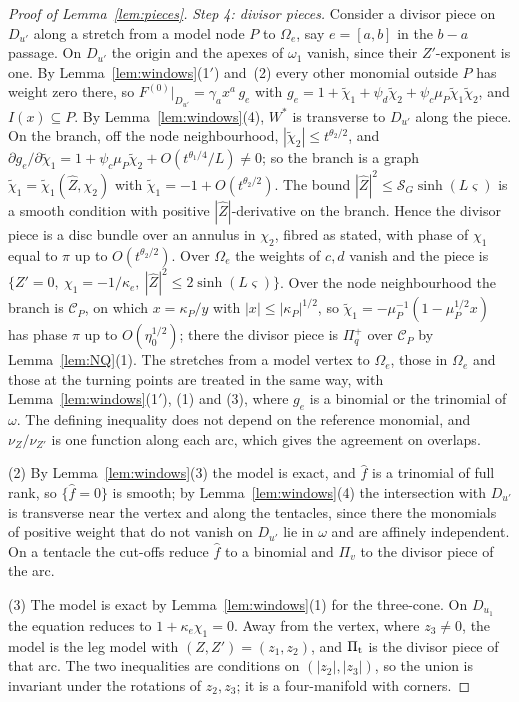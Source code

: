 \begin{proof}[Proof of Lemma~\ref{lem:pieces}]
\emph{Step 4: divisor pieces.} Consider a divisor piece on $D_{u'}$ along a stretch from a model node $P$ to $\Omega_e$,
say $e=[a,b]$ in the $b-a$ passage. On $D_{u'}$ the origin and the apexes of $\omega_1$ vanish, since their
$Z'$-exponent is one. By Lemma~\ref{lem:windows}(1$'$) and~(2) every other monomial outside $P$ has weight zero there, so
$F^{(0)}|_{D_{u'}}=\gamma_ax^a\,g_e$ with $g_e=1+\tilde\chi_1+\psi_d\tilde\chi_2+\psi_c\mu_P\tilde\chi_1\tilde\chi_2$, and
$I(x)\subseteq P$. By Lemma~\ref{lem:windows}(4), $W^*$ is transverse to $D_{u'}$ along the piece. On the branch, off the
node neighbourhood, $|\tilde\chi_2|\le t^{\theta_2/2}$, and $\partial g_e/\partial\tilde\chi_1=1+\psi_c\mu_P\tilde\chi_2+
O(t^{\theta_1/4}/L)\ne0$; so the branch is a graph $\tilde\chi_1=\tilde\chi_1(\hat Z,\chi_2)$ with $\tilde\chi_1=-1+
O(t^{\theta_2/2})$. The bound $|\hat Z|^2\le\mathcal S_G\sinh(L\varsigma)$ is a smooth condition with positive
$|\hat Z|$-derivative on the branch. Hence the divisor piece is a disc bundle over an annulus in $\chi_2$, fibred as
stated, with phase of $\chi_1$ equal to $\pi$ up to $O(t^{\theta_2/2})$. Over $\Omega_e$ the weights of $c,d$ vanish and
the piece is $\{Z'=0,\ \chi_1=-1/\kappa_e,\ |\hat Z|^2\le2\sinh(L\varsigma)\}$. Over the node neighbourhood the branch is
$\mathscr C_P$, on which $x=\kappa_P/y$ with $|x|\le|\kappa_P|^{1/2}$, so $\tilde\chi_1=-\mu_P^{-1}(1-\mu_P^{1/2}x)$ has phase
$\pi$ up to $O(\eta_0^{1/2})$; there the divisor piece is $\Pi^+_q$ over $\mathscr C_P$ by Lemma~\ref{lem:NQ}(1). The
stretches from a model vertex to $\Omega_e$, those in $\Omega_e$ and those at the turning points are treated in the same
way, with Lemma~\ref{lem:windows}(1$'$), (1) and (3), where $g_e$ is a binomial or the trinomial of $\omega$. The defining
inequality does not depend on the reference monomial, and $\nu_Z/\nu_{Z'}$ is one function along each arc, which gives
the agreement on overlaps.

(2) By Lemma~\ref{lem:windows}(3) the model is exact, and $\hat f$ is a trinomial of full rank, so $\{\hat f=0\}$ is smooth;
by Lemma~\ref{lem:windows}(4) the intersection with $D_{u'}$ is transverse near the vertex and along the tentacles, since
there the monomials of positive weight that do not vanish on $D_{u'}$ lie in $\omega$ and are affinely independent. On a
tentacle the cut-offs reduce $\hat f$ to a binomial and $\Pi_v$ to the divisor piece of the arc.

(3) The model is exact by Lemma~\ref{lem:windows}(1) for the three-cone. On $D_{u_1}$ the equation reduces to
$1+\kappa_e\chi_1=0$. Away from the vertex, where $z_3\ne0$, the model is the leg model with $(Z,Z')=(z_1,z_2)$, and
$\Pi_{\rm t}$ is the divisor piece of that arc. The two inequalities are conditions on $(|z_2|,|z_3|)$, so the union is
invariant under the rotations of $z_2,z_3$; it is a four-manifold with corners.
\end{proof}

